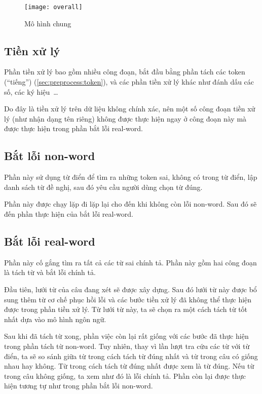 \documentclass[a4paper,oneside,14pt]{extbook} %
\begin{document}
\begin{figure}[htbp]
  \centering
  \texttt{[image: overall]}
  \caption{Mô hình chung}
  \label{fig:overall-model}
\end{figure}


\subsection{Tiền xử lý}

Phần tiền xử lý bao gồm nhiều công đoạn, bắt đầu bằng phần tách các
token (``tiếng'') (\ref{sec:preprocess:token}), và các phần tiền xử lý
khác như đánh dấu các số, các ký hiệu~\ldots

Do đây là tiền xử lý trên dữ liệu không chính xác, nên một số công
đoạn tiền xử lý (như nhận dạng tên riêng) không được thực hiện ngay ở
công đoạn này mà được thực hiện trong phần bắt lỗi real-word.

\subsection{Bắt lỗi non-word}

Phần này sử dụng từ điển để tìm ra những token sai, không có trong từ
điển, lập danh sách từ đề nghị, sau đó yêu cầu người dùng chọn từ
đúng.

Phần này được chạy lặp đi lặp lại cho đến khi không còn lỗi
non-word. Sau đó sẽ đến phần thực hiện của bắt lỗi real-word.

\subsection{Bắt lỗi real-word}

Phần này cố gắng tìm ra tất cả các từ sai chính tả. Phần này gồm hai
công đoạn là tách từ và bắt lỗi chính tả.

Đầu tiên, lưới từ của câu đang xét sẽ được xây dựng. Sau đó lưới từ
này được bổ sung thêm từ cơ chế phục hồi lỗi và các bước tiền xử lý đã
không thể thực hiện được trong phần tiền xử lý. Từ lưới từ này, ta sẽ
chọn ra một cách tách từ tốt nhất dựa vào mô hình ngôn ngữ.

Sau khi đã tách từ xong, phần việc còn lại rất giống với các bước đã
thực hiện trong phần tách từ non-word. Tuy nhiên, thay vì lần lượt tra cứu
các từ với từ điển, ta sẽ so sánh giữa từ trong cách tách từ đúng nhất
và từ trong câu có giống nhau hay không. Từ trong cách tách từ đúng
nhất được xem là từ đúng. Nếu từ trong câu không giống, ta xem như đó
là lỗi chính tả. Phần còn lại được thực hiện tương tự như trong phần
bắt lỗi non-word.
\end{document}
